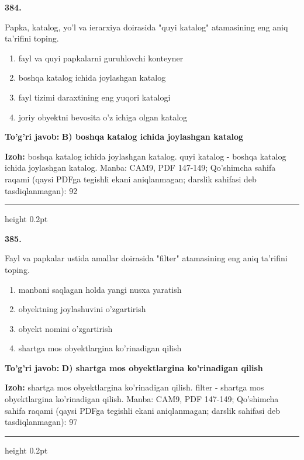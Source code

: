 \documentclass[10pt,a4paper]{article}
\begin{document}
{\bfseries\sffamily\color{ink} 384.}
\par
Papka, katalog, yo'l va ierarxiya doirasida "quyi katalog" atamasining eng aniq ta'rifini toping.
\begin{enumerate}[label=\Alph*),leftmargin=9mm]
\item fayl va quyi papkalarni guruhlovchi konteyner
\item boshqa katalog ichida joylashgan katalog
\item fayl tizimi daraxtining eng yuqori katalogi
\item joriy obyektni bevosita o'z ichiga olgan katalog
\end{enumerate}
\begin{tcolorbox}[enhanced,breakable,colback=teal!4,colframe=teal!60!black,boxrule=0.45pt,arc=1.2mm,left=2.7mm,right=2.7mm,top=1.8mm,bottom=1.8mm,before skip=2mm,after skip=2mm]
{\bfseries\sffamily\color{teal}To'g'ri javob:} \textbf{B) boshqa katalog ichida joylashgan katalog}
\par\smallskip
{\bfseries Izoh:} boshqa katalog ichida joylashgan katalog. quyi katalog - boshqa katalog ichida joylashgan katalog. Manba: CAM9, PDF 147-149; Qo'shimcha sahifa raqami (qaysi PDFga tegishli ekani aniqlanmagan; darslik sahifasi deb tasdiqlanmagan): 92
\end{tcolorbox}
\vspace{2mm}\hrule height 0.2pt\vspace{3mm}

{\bfseries\sffamily\color{ink} 385.}
\par
Fayl va papkalar ustida amallar doirasida "filter" atamasining eng aniq ta'rifini toping.
\begin{enumerate}[label=\Alph*),leftmargin=9mm]
\item manbani saqlagan holda yangi nusxa yaratish
\item obyektning joylashuvini o'zgartirish
\item obyekt nomini o'zgartirish
\item shartga mos obyektlargina ko'rinadigan qilish
\end{enumerate}
\begin{tcolorbox}[enhanced,breakable,colback=teal!4,colframe=teal!60!black,boxrule=0.45pt,arc=1.2mm,left=2.7mm,right=2.7mm,top=1.8mm,bottom=1.8mm,before skip=2mm,after skip=2mm]
{\bfseries\sffamily\color{teal}To'g'ri javob:} \textbf{D) shartga mos obyektlargina ko'rinadigan qilish}
\par\smallskip
{\bfseries Izoh:} shartga mos obyektlargina ko'rinadigan qilish. filter - shartga mos obyektlargina ko'rinadigan qilish. Manba: CAM9, PDF 147-149; Qo'shimcha sahifa raqami (qaysi PDFga tegishli ekani aniqlanmagan; darslik sahifasi deb tasdiqlanmagan): 97
\end{tcolorbox}
\vspace{2mm}\hrule height 0.2pt\vspace{3mm}
\end{document}
